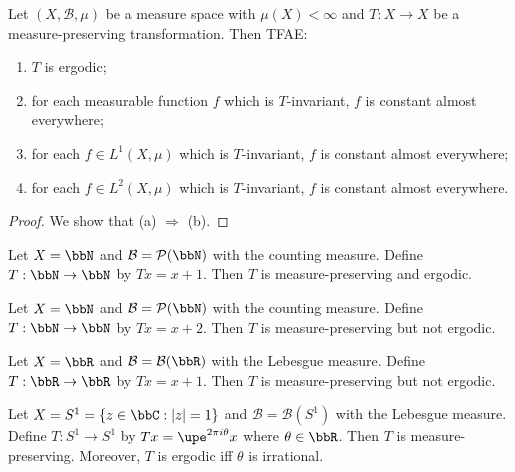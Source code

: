     \begin{theorem}\label{thm:ergodic_imply_invariant_function_constant_ae}
        Let \((X, \mathcal{B}, \mu)\) be a measure space with \(\mu(X) < \infty\) and \(T:X\to X\) be a measure-preserving transformation.
        Then TFAE:
        \begin{enumerate}
            \item \(T\) is ergodic;
            \item for each measurable function \(f\) which is \(T\)-invariant, \(f\) is constant almost everywhere;
            \item for each \(f\in L^1(X, \mu)\) which is \(T\)-invariant, \(f\) is constant almost everywhere;
            \item for each \(f\in L^2(X, \mu)\) which is \(T\)-invariant, \(f\) is constant almost everywhere.
        \end{enumerate}
    \end{theorem}
    \begin{proof}

        We show that (a) \(\Rightarrow\) (b).
    \end{proof}
 
    \begin{example}\label{eg:transition_of_natural_numbers}
        Let \(X = \bbN\) and \(\mathcal{B} = \mathcal{P}(\bbN)\) with the counting measure.
        Define \(T:\bbN \to \bbN\) by \(Tx = x + 1\).
        Then \(T\) is measure-preserving and ergodic.
    \end{example}

    \begin{example}\label{eg:transition_by_2_of_natural_numbers}
        Let \(X = \bbN\) and \(\mathcal{B} = \mathcal{P}(\bbN)\) with the counting measure.
        Define \(T:\bbN \to \bbN\) by \(Tx = x + 2\).
        Then \(T\) is measure-preserving but not ergodic.
    \end{example}

    \begin{example}\label{eg:transition_by_1_of_real_numbers}
        Let \(X = \bbR\) and \(\mathcal{B} = \mathcal{B}(\bbR)\) with the Lebesgue measure.
        Define \(T:\bbR \to \bbR\) by \(Tx = x + 1\).
        Then \(T\) is measure-preserving but not ergodic.
    \end{example}

    \begin{example}\label{eg:rotation_on_unit_circle}
        Let \(X = S^1 = \{z\in \bbC: |z| = 1\}\) and \(\mathcal{B} = \mathcal{B}(S^1)\) with the Lebesgue measure.
        Define \(T:S^1 \to S^1\) by \(Tx = \upe^{2\pi i \theta} x\) where \(\theta \in \bbR\).
        Then \(T\) is measure-preserving.
        Moreover, \(T\) is ergodic iff \(\theta\) is irrational.
    \end{example}

